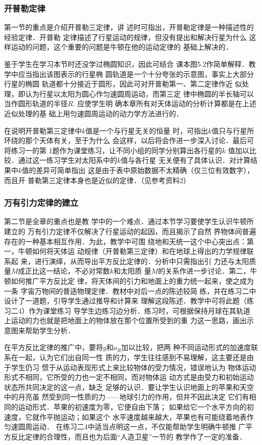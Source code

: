 \subsubsection{开普勒定律}

第一节的重点是介绍开普勒三定律，讲
述时可指出，开普勒定律是一种描述性的经验定律．开普勒
定律描述了行星运动的规律，但没有提出和解决行星为什么
这样运动的问题，这个重要的问题是牛顿在他的运动定律的
基础上解决的．

鉴于学生在学习本节时还没学过椭圆知识，因此可结合
课本图5.2作简单解释．教学中应当指出该图表示的行星椭
圆轨道是一个十分夸张的示意图，事实上大部分行星的椭圆
轨道都十分接近于圆形，因此可对开普勒第一、第二定律作近
似处理，即认为行星以太阳为圆心作匀速圆周运动，而第三定
律中椭圆的半长轴可以当作圆形轨道的半径$R$. 应使学生明
确本章所有对天体运动的分析计算都是在上述近似处理的基
础上用匀速圆周运动的动力学方法进行的．

在说明开普勒第三定律中$k$值是一个与行星无关的恒量
时，可指出$k$值只与行星所环绕的那个天体有关，至于为什么
会这样，以后将会作进一步深入讨论．最后可将练习一的第
1题作为课堂练习，让不同小组的同学分别算出各行星的$k$
值加以比较．通过这一练习学生对太阳系中的$k$值与各行星
无关便有了具体认识．对计算结果中$k$值的差异可简单指出
这是由于表中原始数据不太精确（仅三位有效数字），而且开
普勒第三定律本身也是近似的定律．（见参考资料2）

\subsubsection{万有引力定律的建立}

第二节是全章的重点也是教
学中的一个难点．通过本节学习要使学生认识牛顿所建立的
万有引力定律不仅解决了行星运动的起因，而且揭示了自然
界物体间普遍存在的一种基本相互作用．为此，教学中可围
绕地和天统一这个中心突出点：第一，牛顿如何将天体运
动规律（开普勒第三定律）和在地球上得出的力学规律联系起
来，进行演绎，从而导出平方反比定律的．分析中只需指出引
力还与太阳质量$M$成正比这一结论，不必对常数$k$和太阳质
量$M$的关系作进一步讨论．第二，牛顿如何推广平方反比定
律，将天体间的引力和地面上的重力统一起来，使之成为一条
字宙万物间的普适物理定律．教材中对后一点的陈述较简
练，并在练习二中设计了一道题，引导学生通过推导和计算来
理解这段陈述．教学中可将此题（练习二4）作为课堂练习
导学生边练习边分析．练习时，可根据保持月球在其轨道
上运动的力也就是把地面上的物体放在那个位置所受到的重
力这一思路，画出示意图来帮助学生分析．

在平方反比定律的推广中，要将$g$和$a_R$加以比较，把两
种不同运动形式的加速度联系在一起，认为它们出自同一性
质的力，学生往往感到不易理解，这主要还是由于学生仍习
惯于从运动表现形式上来比较物体的受力情况，错误地认为
物体运动形式不相同，它所受的力也一定不相同，而对物体运
动方式是由受力和初始运动状态所共同决定的这一点，缺乏
足够的认识．要让学生认识地面上的苹果和天空中的月亮虽
然受到同一性质的力——地球引力的作用，但并不因此决定
它们有相同的运动形式．苹果的初速度为零，它便自由下落；
如果给它一个水平方向的初速度，它就作平抛运动；如果这个
水平速度越来越大，苹果也有可能绕着地表作匀速圆周运动．
在练习二4中适当点明这一点，不仅能帮助学生明确牛顿推
广平方反比定律的合理性，而且也为后面“人造卫星”一节的
教学作了一定的准备．

